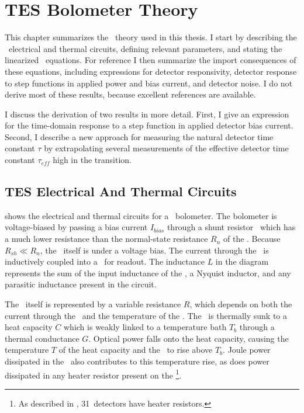 \chapter{\textsc{TES} Bolometer Theory}\label{c:tes}

This chapter summarizes the \TES\ theory used in this thesis.
I start by describing the \TES\ electrical and thermal circuits, defining relevant parameters, and stating the linearized \TES\ equations.
For reference I then summarize the import consequences of these equations, including expressions for detector responsivity, detector response to step functions in applied power and bias current, and detector noise.
I do not derive most of these results, because excellent references are available\cite{irwin_application_1995,irwin_transition-edge_2005, mather_bolometer_1982}.

I discuss the derivation of two results in more detail.
First, I give an expression for the time-domain response to a step function in applied detector bias current.
Second, I describe a new approach for measuring the natural detector time constant $\tau$ by extrapolating several measurements of the effective detector time constant $\tau_{eff}$ high in the transition. 

\section{\textsc{TES} Electrical And Thermal Circuits}

 shows the electrical and thermal circuits for a \TES\ bolometer.
The bolometer is voltage-biased by passing a bias current $I_{bias}$ through a shunt resistor \Rsh\ which has a much lower resistance than the normal-state resistance $R_n$ of the \TES.
Because $R_{sh} \ll R_n$, the \TES\ itself is under a voltage bias.
The current through the \TES\ is inductively coupled into a \SQUID\ for readout.
The inductance $L$ in the diagram represents the sum of the input inductance of the \SQUID, a Nyquist inductor, and any parasitic inductance present in the circuit.

The \TES\ itself is represented by a variable resistance $R$, which depends on both the current through the \TES\ and the temperature of the \TES.
The \TES\ is thermally sunk to a heat capacity $C$ which is weakly linked to a temperature bath $T_b$ through a thermal conductance $G$.
Optical power falls onto the heat capacity, causing the temperature $T$ of the heat capacity and the \TES\ to rise above $T_b$.
Joule power dissipated in the \TES\ also contributes to this temperature rise, as does power dissipated in any heater resistor present on the \TES\footnote{As described in , 31~detectors have heater resistors.}.

